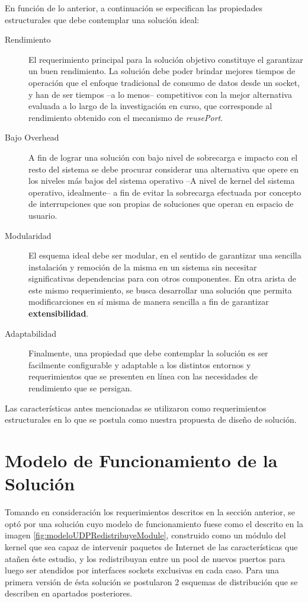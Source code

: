 En función de lo anterior, a continuación se especifican las propiedades estructurales que debe contemplar una solución ideal:

\begin{description}
\item[Rendimiento] El requerimiento principal para la solución objetivo constituye el garantizar un buen rendimiento. La solución debe poder brindar mejores tiempos de operación que el enfoque tradicional de consumo de datos desde un socket, y han de ser tiempos --a lo menos-- competitivos con la mejor alternativa evaluada a lo largo de la investigación en curso, que corresponde al rendimiento obtenido con el mecanismo de \emph{reusePort}.
\item[Bajo Overhead] A fin de lograr una solución con bajo  nivel de sobrecarga e impacto con el resto del sistema se debe procurar considerar una alternativa que opere en los niveles más bajos del sistema operativo --A nivel de kernel del sistema operativo, idealmente-- a fin de evitar la sobrecarga efectuada por concepto de interrupciones que son propias de soluciones que operan en espacio de usuario.
\item[Modularidad] El esquema ideal debe ser modular, en el sentido de garantizar una sencilla instalación y remoción de la misma en un sistema sin necesitar significativas dependencias para con otros componentes. En otra arista de este mismo requerimiento, se busca desarrollar una solución que permita modificarciones en sí misma de manera sencilla a fin de garantizar \textbf{extensibilidad}.
\item[Adaptabilidad] Finalmente, una propiedad que debe contemplar la solución es ser facilmente configurable y adaptable a los distintos entornos y requerimientos que se presenten en línea con las necesidades de rendimiento que se persigan.
\end{description}

Las características antes mencionadas se utilizaron como requerimientos estructurales en lo que se postula como nuestra propuesta de diseño de solución.

\section{Modelo de Funcionamiento de la Solución}
Tomando en consideración los requerimientos descritos en la sección anterior, se optó por una solución cuyo modelo de funcionamiento fuese como el descrito en la imagen \ref{fig:modeloUDPRedistribuyeModule}, construido como un módulo del kernel que sea capaz de intervenir paquetes de Internet de las características que atañen éste estudio, y los redistribuyan entre un pool de nuevos puertos para luego ser atendidos por interfaces sockets exclusivas en cada caso. Para una primera versión de ésta solución se postularon 2 esquemas de distribución que se describen en apartados posteriores.

